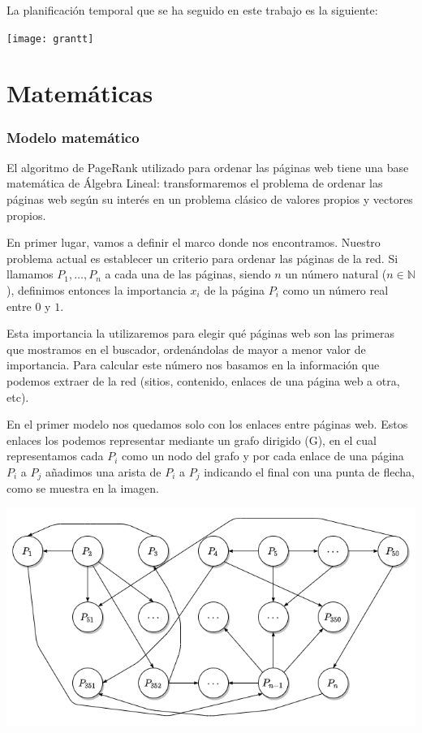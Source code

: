 \documentclass[size=a4, parskip=half, titlepage=false, toc=flat, toc=bib, 12pt, twoside]{scrartcl}
\theoremstyle{theorem-style}
\theoremstyle{definition-style}
\theoremstyle{remark-style}
\theoremstyle{example-style}
\theoremstyle{definition-style}
\theoremstyle{remark-style}
\begin{document}
La planificación temporal que se ha seguido en este trabajo es la siguiente:
\begin{center}
\texttt{[image: grantt]}
\end{center}

\newpage

\part{Matemáticas}

\section{Modelo matemático}

El algoritmo de PageRank utilizado para ordenar las páginas web tiene una base matemática de Álgebra Lineal: transformaremos el problema de ordenar las páginas web según su interés en un problema clásico de valores propios y vectores propios.

En primer lugar, vamos a definir el marco donde nos encontramos. Nuestro problema actual es establecer un criterio para ordenar las páginas de la red. Si llamamos $P_1, \dots, P_n$ a cada una de las páginas, siendo $n$ un número natural ($n \in \mathbb{N}$), definimos entonces la importancia $x_i$  de la página $P_i$ como un número real entre $0$ y $1$.

Esta importancia la utilizaremos para elegir qué páginas web son las primeras que mostramos en el buscador, ordenándolas de mayor  a menor valor de importancia.
Para calcular este número nos basamos en la información que podemos extraer de la red (sitios, contenido, enlaces de una página web a otra, etc).

En el primer modelo nos quedamos solo con los enlaces entre páginas web. Estos enlaces los podemos representar mediante un grafo dirigido (G), en el cual representamos cada $P_i$ como un nodo del grafo y por cada enlace de una página $P_i$ a $P_j$ añadimos una arista de $P_i$ a $P_j$ indicando el final con una punta de flecha, como se muestra en la imagen.

\includegraphics[width=1.0\textwidth]{./img/grafogrande}
\end{document}
